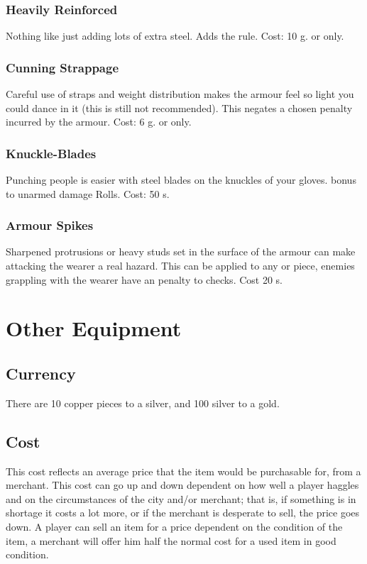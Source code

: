 \subsection{Heavily Reinforced}
Nothing like just adding lots of extra steel. Adds the  rule. Cost: 10 g.  or  only.

\subsection{Cunning Strappage}
Careful use of straps and weight distribution makes the armour feel so light you could dance in it (this is still not recommended). This negates a chosen  penalty incurred by the armour. Cost: 6 g.  or  only.

\subsection{Knuckle-Blades}
Punching people is easier with steel blades on the knuckles of your gloves.  bonus to unarmed damage Rolls. Cost: 50 s.

\subsection{Armour Spikes}
Sharpened protrusions or heavy studs set in the surface of the armour can make attacking the wearer a real hazard. This can be applied to any  or  piece, enemies grappling with the wearer have an  penalty to  checks. Cost 20 s.



\chapter{Other Equipment}

\section{Currency}
There are 10 copper pieces to a silver, and 100 silver to a gold.

\section{Cost}
This cost reflects an average price that the item would be purchasable for, from a merchant. This cost can go up and down dependent on how well a player haggles and on the circumstances of the city and/or merchant; that is, if something is in shortage it costs a lot more, or if the merchant is desperate to sell, the price goes down. A player can sell an item for a price dependent on the condition of the item, a merchant will offer him half the normal cost for a used item in good condition.

